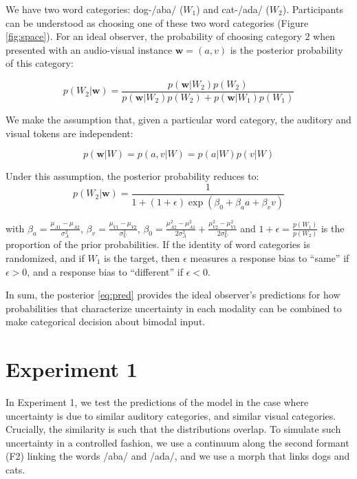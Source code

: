 \documentclass[10pt,letterpaper]{article}
\begin{document}
We have two word categories: dog-/aba/ ($W_1$) and cat-/ada/ ($W_2$). Participants can be understood as choosing one of these two word categories (Figure \ref{fig:space}). For an ideal observer, the probability of choosing category 2 when presented with an audio-visual instance $\mathbf{w}=(a,v)$ is the posterior probability of this category:

\begin{equation}
p(W_2 | \mathbf{w})=\frac{p(\mathbf{w}|W_2)p(W_2)}{p(\mathbf{w}|W_2)p(W_2)+p(\mathbf{w}|W_1)p(W_1)}
\end{equation}

We make the assumption that, given a particular word category, the auditory and visual tokens are independent:

\begin{equation}
p(\mathbf{w} | W) = p(a,v| W) = p(a| W)p(v| W)
\end{equation}

Under this assumption, the posterior probability reduces to:
\begin{equation}
p(W_2 | \mathbf{w})=\frac{1}{1+(1+\epsilon)\exp(\beta_0+\beta_aa+\beta_vv)}
\label{eq:pred}
\end{equation}

\noindent with $\beta_a=\frac{\mu_{A1}-\mu_{A2}}{\sigma^2_{A}}$,
$\beta_v=\frac{\mu_{V1}-\mu_{V2}}{\sigma^2_{V}}$,
$\beta_0=\frac{\mu^2_{A2}-\mu^2_{A1}}{2\sigma^2_{A}}+\frac{\mu^2_{V2}-\mu^2_{V1}}{2\sigma^2_{V}}$
and $1+\epsilon=\frac{p(W_1)}{p(W_2)}$ is the proportion of the prior probabilities. If the identity of word categories is randomized, and if $W_1$ is the target, then $\epsilon$ measures a response bias to ``same'' if $\epsilon > 0 $, and a response bias to ``different'' if $\epsilon < 0 $.

In sum, the posterior \ref{eq:pred} provides the ideal observer's predictions for how probabilities that characterize uncertainty in each modality can be combined to make categorical decision about bimodal input.


\section{Experiment 1}

In Experiment 1, we test the predictions of the model in the case where uncertainty is due to similar auditory categories, and similar visual categories. Crucially, the similarity is such that the distributions overlap. To simulate such uncertainty in a controlled fashion, we use a continuum along the second formant (F2) linking the words /aba/ and /ada/, and we use a morph that links dogs and cats.
\end{document}
